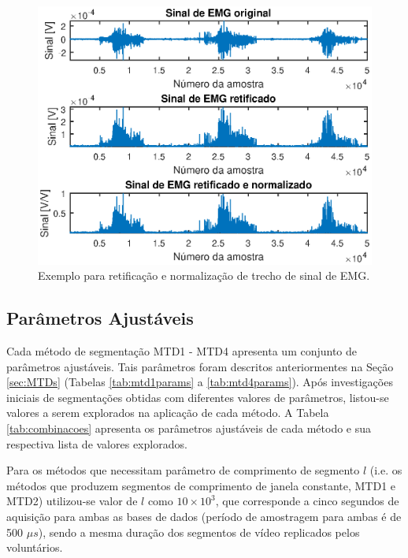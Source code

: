\begin{figure}[htb]
	\caption{\label{fig:normalization}Exemplo para retificação e normalização de trecho de sinal de EMG.}
	\begin{center}
	    \includegraphics[width=0.75\linewidth]{./img/matlab/prettyRaw.eps}
	\end{center}
\end{figure}

				\subsection{Parâmetros Ajustáveis}
Cada método de segmentação MTD1 - MTD4 apresenta um conjunto de parâmetros ajustáveis. Tais parâmetros foram descritos anteriormentes na Seção \ref{sec:MTDs} (Tabelas \ref{tab:mtd1params} a \ref{tab:mtd4params}). Após investigações iniciais de segmentações obtidas com diferentes valores de parâmetros, listou-se valores a serem explorados na aplicação de cada método. A Tabela \ref{tab:combinacoes} apresenta os parâmetros ajustáveis de cada método e sua respectiva lista de valores explorados.



Para os métodos que necessitam parâmetro de comprimento de segmento $l$ (i.e. os métodos que produzem segmentos de comprimento de janela constante, MTD1 e MTD2) utilizou-se valor de $l$ como $10 \times 10^3$, que corresponde a cinco segundos de aquisição para ambas as bases de dados (período de amostragem para ambas é de 500 $\mu s$), sendo a mesma duração dos segmentos de vídeo replicados pelos voluntários.


